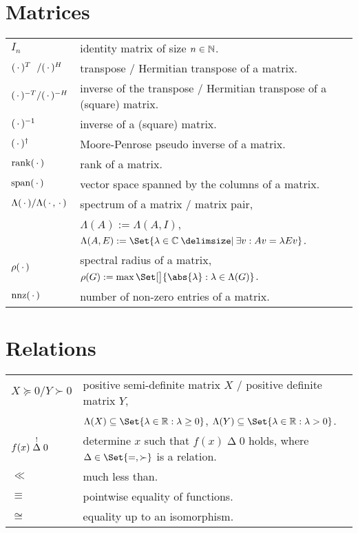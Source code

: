 \section*{Matrices}

\noindent
\begin{tabular}{@{}p{2.5cm}l}
  $I_n$ & identity matrix of size $n\in\mathbb{N}$. \\
  $\mathrlap{(\optional{})^\T} \hphantom{(\optional{})^{-\T}} / (\optional{})^\HT$ & transpose / Hermitian transpose of a matrix. \\
  $(\optional{})^{-\T} / (\optional{})^{-\HT}$ & inverse of the transpose / Hermitian transpose of a (square) matrix. \\
  $(\optional{})^{-1}$ & inverse of a (square) matrix. \\
  $(\optional{})^\MP$ & Moore-Penrose pseudo inverse of a matrix. \\
  $\rank(\optional{})$ & rank of a matrix. \\
  $\colspan(\optional{})$ & vector space spanned by the columns of a matrix. \\
  $\Lambda(\optional{}) / \Lambda(\optional{},\optional{})$ & spectrum of a matrix / matrix pair,\\
    & $\Lambda(A) := \Lambda(A, I)$, $\Lambda(A, E) := \Set{\lambda\in\C \given \exists v : Av = \lambda Ev}$. \\
  $\rho(\optional{})$ & spectral radius of a matrix, $\rho(G) := \max\Set[\big]{\abs{\lambda} : \lambda\in\Lambda(G)}$. \\
  $\nnz(\optional{})$ & number of non-zero entries of a matrix.
\end{tabular}

\section*{Relations}

\noindent
\begin{tabular}{@{}p{2.5cm}l}
  $X \succeq 0 / Y \succ 0$ & positive semi-definite matrix $X$ / positive definite matrix $Y$, \\
    & $\Lambda(X) \subseteq \Set{\lambda\in\R : \lambda\geq 0}$, $\Lambda(Y) \subseteq \Set{\lambda\in\R : \lambda > 0}$. \\
  $f(x) \mathrel{\smash{\overset{!}{\Delta}}} 0$ & determine $x$ such that $f(x) \mathrel{\Delta} 0$ holds, where $\Delta\in\Set{=,\succ}$ is a relation. \\
  $\ll$ & much less than. \\
  $\equiv$ & pointwise equality of functions. \\
  $\cong$ & equality up to an isomorphism.
\end{tabular}

